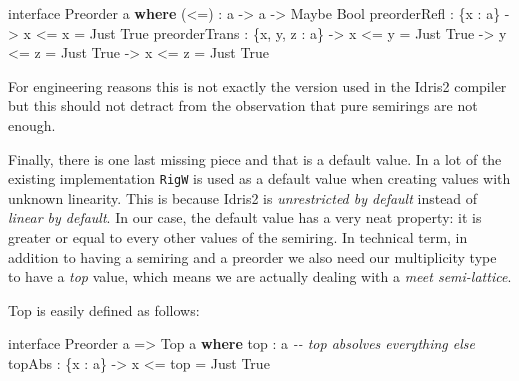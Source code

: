 \documentclass[
]{article}
\newenvironment{Shaded}{}{}
\newcommand{\CommentTok}[1]{\textcolor[rgb]{0.38,0.63,0.69}{\textit{#1}}}
\newcommand{\DataTypeTok}[1]{\textcolor[rgb]{0.56,0.13,0.00}{#1}}
\newcommand{\KeywordTok}[1]{\textcolor[rgb]{0.00,0.44,0.13}{\textbf{#1}}}
\newcommand{\NormalTok}[1]{#1}
\newcommand{\OperatorTok}[1]{\textcolor[rgb]{0.40,0.40,0.40}{#1}}
\newcommand{\OtherTok}[1]{\textcolor[rgb]{0.00,0.44,0.13}{#1}}
\begin{document}
\begin{Shaded}
\begin{Highlighting}[]
\NormalTok{interface }\DataTypeTok{Preorder}\NormalTok{ a }\KeywordTok{where}
\NormalTok{  (}\OperatorTok{\textless{}=}\NormalTok{) }\OperatorTok{:}\NormalTok{ a }\OtherTok{{-}\textgreater{}}\NormalTok{ a }\OtherTok{{-}\textgreater{}} \DataTypeTok{Maybe} \DataTypeTok{Bool}
\NormalTok{  preorderRefl }\OperatorTok{:}\NormalTok{ \{x }\OperatorTok{:}\NormalTok{ a\} }\OtherTok{{-}\textgreater{}}\NormalTok{ x }\OperatorTok{\textless{}=}\NormalTok{ x }\OtherTok{=} \DataTypeTok{Just} \DataTypeTok{True}
\NormalTok{  preorderTrans }\OperatorTok{:}\NormalTok{ \{x, y, z }\OperatorTok{:}\NormalTok{ a\} }\OtherTok{{-}\textgreater{}}\NormalTok{ x }\OperatorTok{\textless{}=}\NormalTok{ y }\OtherTok{=} \DataTypeTok{Just} \DataTypeTok{True} 
                                \OtherTok{{-}\textgreater{}}\NormalTok{ y }\OperatorTok{\textless{}=}\NormalTok{ z }\OtherTok{=} \DataTypeTok{Just} \DataTypeTok{True} 
                                \OtherTok{{-}\textgreater{}}\NormalTok{ x }\OperatorTok{\textless{}=}\NormalTok{ z }\OtherTok{=} \DataTypeTok{Just} \DataTypeTok{True}
\end{Highlighting}
\end{Shaded}

For engineering reasons this is not exactly the version used in the
Idris2 compiler but this should not detract from the observation that
pure semirings are not enough.

Finally, there is one last missing piece and that is a default value. In
a lot of the existing implementation \texttt{RigW} is used as a default
value when creating values with unknown linearity. This is because
Idris2 is \emph{unrestricted by default} instead of \emph{linear by
default}. In our case, the default value has a very neat property: it is
greater or equal to every other values of the semiring. In technical
term, in addition to having a semiring and a preorder we also need our
multiplicity type to have a \emph{top} value, which means we are
actually dealing with a \emph{meet semi-lattice}.

Top is easily defined as follows:

\begin{Shaded}
\begin{Highlighting}[]
\NormalTok{interface }\DataTypeTok{Preorder}\NormalTok{ a }\OtherTok{=\textgreater{}} \DataTypeTok{Top}\NormalTok{ a }\KeywordTok{where}
\NormalTok{  top }\OperatorTok{:}\NormalTok{ a}
  \CommentTok{{-}{-} top absolves everything else}
\NormalTok{  topAbs }\OperatorTok{:}\NormalTok{ \{x }\OperatorTok{:}\NormalTok{ a\} }\OtherTok{{-}\textgreater{}}\NormalTok{ x }\OperatorTok{\textless{}=}\NormalTok{ top }\OtherTok{=} \DataTypeTok{Just} \DataTypeTok{True}
\end{Highlighting}
\end{Shaded}
\end{document}
